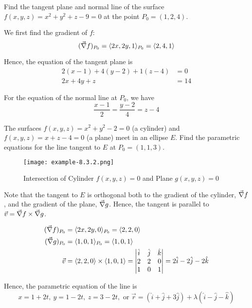 \begin{example}
    \normalfont Find the tangent plane and normal line of the surface $f(x, y, z) = x^2 + y^2 + z - 9 = 0$ at the point
    $P_0 = (1, 2, 4)$.

    We first find the gradient of $f$:
    $$(\vec{\nabla} f)_{P_0} = \langle 2x, 2y, 1 \rangle_{P_0} = \langle 2, 4, 1\rangle$$

    Hence, the equation of the tangent plane is
    \begin{align*}
        2 (x - 1) + 4 (y - 2) + 1 (z - 4) &= 0 \\
        2x + 4y + z &= 14
    \end{align*}

    For the equation of the normal line at $P_0$, we have
    $$\frac{x - 1}{2} = \frac{y - 2}{4} = z - 4$$
\end{example}

\begin{example}
    \normalfont The surfaces $f(x, y, z) = x^2 + y^2 - 2 = 0$ (a cylinder) and $f(x, y, z) = x + z - 4 = 0$ (a plane)
    meet in an ellipse $E$. Find the parametric equations for the line tangent to $E$ at $P_0 = (1, 1, 3)$.

    \begin{figure}[htp]
        \centering
        \texttt{[image: example-8.3.2.png]}
        \caption{Intersection of Cylinder $f(x, y, z) = 0$ and Plane $g(x, y, z) = 0$}
    \end{figure}

    Note that the tangent to $E$ is orthogonal both to the gradient of the cylinder, $\vec{\nabla} f$, and the gradient
    of the plane, $\vec{\nabla} g$. Hence, the tangent is parallel to $\vec{v} = \vec{\nabla} f \times \vec{\nabla} g$.

    \begin{align*}
        (\vec{\nabla} f)_{P_0} &= \langle 2x, 2y, 0 \rangle_{P_0} = \langle 2, 2, 0 \rangle \\
        (\vec{\nabla} g)_{P_0} &= \langle 1, 0, 1 \rangle_{P_0} = \langle 1, 0, 1\rangle \\
        \vec{v} &= \langle 2, 2, 0 \rangle \times \langle 1, 0, 1 \rangle =
        \begin{vmatrix}
            \hat{i} & \hat{j} & \hat{k} \\
            2 & 2 & 0 \\
            1 & 0 & 1
        \end{vmatrix} = 2\hat{i} - 2\hat{j} - 2\hat{k}
    \end{align*}

    Hence, the parametric equation of the line is
    $$x = 1 + 2t, \ y = 1 - 2t, \ z = 3 - 2t, \text{  or  } \vec{r} = (\hat{i} + \hat{j} + 3\hat{j}) +
    \lambda (\hat{i} - \hat{j} - \hat{k})$$
\end{example}